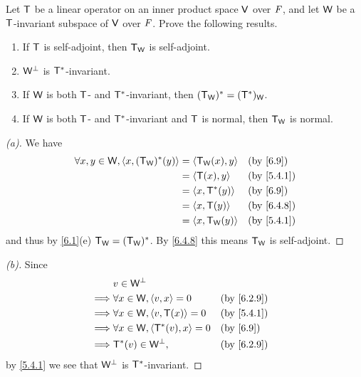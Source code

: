 \begin{ex}\label{ex:6.4.7}
	Let \(\mathsf{T}\) be a linear operator on an inner product space \(\mathsf{V}\) over \(\mathit{F}\), and let \(\mathsf{W}\) be a \(\mathsf{T}\)-invariant subspace of \(\mathsf{V}\) over \(\mathit{F}\).
	Prove the following results.
	\begin{enumerate}
		\item If \(\mathsf{T}\) is self-adjoint, then \(\mathsf{T}_{\mathsf{W}}\) is self-adjoint.
		\item \(\mathsf{W}^{\perp}\) is \(\mathsf{T}^*\)-invariant.
		\item If \(\mathsf{W}\) is both \(\mathsf{T}\)- and \(\mathsf{T}^*\)-invariant, then \((\mathsf{T}_{\mathsf{W}})^* = (\mathsf{T}^*)_{\mathsf{W}}\).
		\item If \(\mathsf{W}\) is both \(\mathsf{T}\)- and \(\mathsf{T}^*\)-invariant and \(\mathsf{T}\) is normal, then \(\mathsf{T}_{\mathsf{W}}\) is normal.
	\end{enumerate}
\end{ex}

\begin{proof}[(a)]
	We have
	\begin{align*}
		\forall x, y \in \W, \inn{x, (\T_{\W})^*(y)} & = \inn{\T_{\W}(x), y} &  & \by{6.9}   \\
		                                             & = \inn{\T(x), y}      &  & \by{5.4.1} \\
		                                             & = \inn{x, \T^*(y)}    &  & \by{6.9}   \\
		                                             & = \inn{x, \T(y)}      &  & \by{6.4.8} \\
		                                             & = \inn{x, \T_{\W}(y)} &  & \by{5.4.1}
	\end{align*}
	and thus by \cref{6.1}(e) \(\mathsf{T}_{\mathsf{W}} = (\mathsf{T}_{\mathsf{W}})^*\).
	By \cref{6.4.8} this means \(\mathsf{T}_{\mathsf{W}}\) is self-adjoint.
\end{proof}

\begin{proof}[(b)]
	Since
	\begin{align*}
		         & v \in \W^{\perp}                                       \\
		\implies & \forall x \in \W, \inn{v, x} = 0       &  & \by{6.2.9} \\
		\implies & \forall x \in \W, \inn{v, \T(x)} = 0   &  & \by{5.4.1} \\
		\implies & \forall x \in \W, \inn{\T^*(v), x} = 0 &  & \by{6.9}   \\
		\implies & \T^*(v) \in \W^{\perp},                &  & \by{6.2.9}
	\end{align*}
	by \cref{5.4.1} we see that \(\mathsf{W}^{\perp}\) is \(\mathsf{T}^*\)-invariant.
\end{proof}

